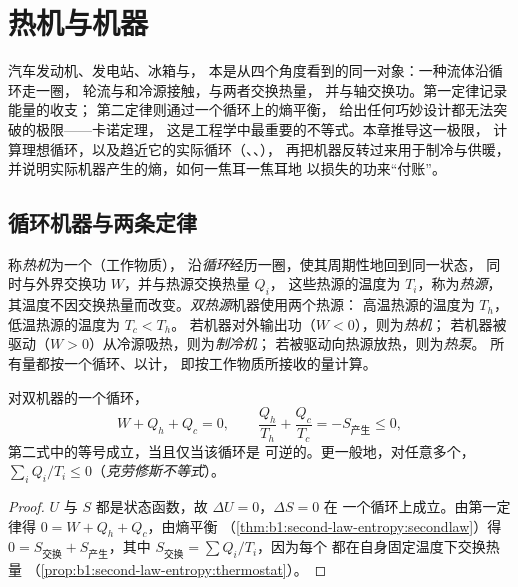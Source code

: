 \chapter{热机与机器}\label{ch:b1:heat-engines}

汽车发动机、发电站、冰箱与，
本是从四个角度看到的同一对象：一种流体沿循环走一圈，
轮流与和冷源接触，与两者交换热量，
并与轴交换功。第一定律记录能量的收支；
第二定律则通过一个循环上的熵平衡，
给出任何巧妙设计都无法突破的极限——卡诺定理，
这是工程学中最重要的不等式。本章推导这一极限，
计算理想循环，以及趋近它的实际循环（、、），
再把机器反转过来用于制冷与供暖，
并说明实际机器产生的熵，如何一焦耳一焦耳地
以损失的功来“付账”。

\section{循环机器与两条定律}

\begin{definition}[热机]\label{def:b1:heat-engines:machine}
称\emph{热机}为一个（工作物质），
沿\emph{循环}经历一圈，使其周期性地回到同一状态，
同时与外界交换功 $W$，并与热源交换热量 $Q_i$，
这些热源的温度为 $T_i$，称为\emph{热源}，
其温度不因交换热量而改变。\emph{双热源}机器使用两个热源：
高温热源的温度为 $T_h$，低温热源的温度为 $T_c < T_h$。
若机器对外输出功（$W < 0$），则为\emph{热机}；
若机器被驱动（$W > 0$）从冷源吸热，则为\emph{制冷机}；
若被驱动向热源放热，则为\emph{热泵}。
所有量都按一个循环、以计，
即按工作物质所接收的量计算。
\end{definition}

\begin{theorem}\label{thm:b1:heat-engines:clausius}
对双机器的一个循环，
\[
W + Q_h + Q_c = 0 , \qquad
\frac{Q_h}{T_h} + \frac{Q_c}{T_c} = -S_{\text{产生}} \leq 0 ,
\]
第二式中的等号成立，当且仅当该循环是
可逆的。更一般地，对任意多个，
$\sum_i Q_i/T_i \leq 0$（\emph{克劳修斯不等式}）。
\end{theorem}

\begin{proof}
$U$ 与 $S$ 都是状态函数，故 $\Delta U = 0$，$\Delta S = 0$ 在
一个循环上成立。由第一定律得 $0 = W + Q_h + Q_c$，由熵平衡
（\cref{thm:b1:second-law-entropy:secondlaw}）得 $0 = S_{\text{交换}} +
S_{\text{产生}}$，其中 $S_{\text{交换}} = \sum Q_i/T_i$，因为每个
都在自身固定温度下交换热量
（\cref{prop:b1:second-law-entropy:thermostat}）。
\end{proof}

